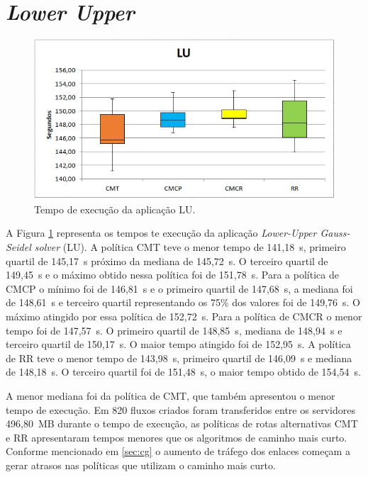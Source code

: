 \section{\textit{Lower Upper}}
\label{sec:lu}
\begin{figure}[!htb]
	\caption{\label{fig:lu}Tempo de execução da aplicação LU.}
	\begin{center}
	    \includegraphics[scale=0.60]{imagens/lu.jpg}
	\end{center}
\end{figure}
A Figura \ref{fig:lu} representa os tempos te execução da aplicação \textit{Lower-Upper Gauss-Seidel solver} (LU). A política CMT teve o menor tempo de 141,18~s, primeiro quartil de 145,17~s próximo da mediana de 145,72~s. O terceiro quartil de 149,45~s e o máximo obtido nessa política foi de 151,78~s. Para a política de CMCP o mínimo foi de 146,81~s e o primeiro quartil de 147,68~s, a mediana foi de 148,61~s e terceiro quartil representando os 75\% dos valores foi de 149,76~s. O máximo atingido por essa política de 152,72~s.  
Para a política de CMCR o menor tempo foi de 147,57~s. O primeiro quartil de 148,85~s, mediana de 148,94~s e terceiro quartil de 150,17~s. O maior tempo atingido foi de 152,95~s. A política de RR teve o menor tempo de 143,98~s, primeiro quartil de 146,09~s e mediana de 148,18~s. O terceiro quartil foi de 151,48~s, o maior tempo obtido de 154,54~s. 

A menor mediana foi da política de CMT, que também apresentou o menor tempo de execução. Em 820 fluxos criados foram transferidos entre os servidores 496,80~MB durante o tempo de execução, as políticas de rotas alternativas CMT e RR apresentaram tempos menores que os algoritmos de caminho mais curto. Conforme mencionado em \ref{sec:cg} o aumento de tráfego dos enlaces começam a gerar atrasos nas políticas que utilizam o caminho mais curto.


